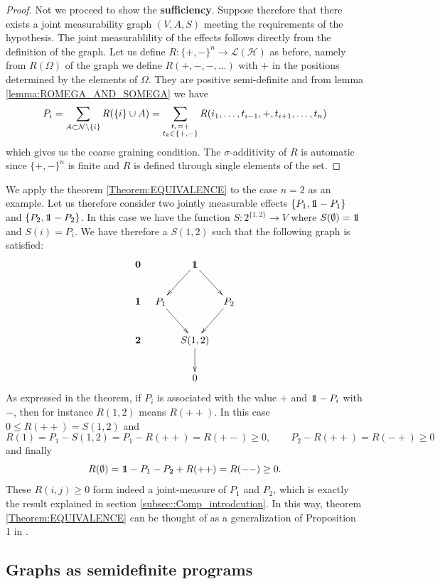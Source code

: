 \documentclass[10pt, a4paper]{amsart}
\begin{document}
\begin{proof}
Not we proceed to show the \textbf{sufficiency}. Suppose therefore that there exists a joint measurability graph $(V,A,S)$ meeting the requirements 
of the hypothesis. The joint measurablility of the effects follows directly from the definition of the graph. Let us define $R:\{+,-\}^{n}\to \mathcal{L}(\mathcal{H})$ as before, namely from $R(\Omega ) $ of the graph we define $R(+,-,-, \ldots )$ with $+$ in the positions determined by the elements of $\Omega$. They are positive semi-definite and from lemma \ref{lemma:ROMEGA_AND_SOMEGA} we have 
$$
P_{i} = \sum_{A\subset \mathcal{N}\backslash \{i\}}R(\{i\}\cup A) = \sum_{\substack{t_{i} = +\\ t_{k}\in \{+,-\}}}  R(i_{1}, \ldots, t_{i-1},+ , t_{i+1}, \ldots, t_{n})
$$
which gives us the coarse graining condition. The $\sigma$-additivity of $R$ is automatic since $\{+,-\}^{n}$ is finite and $R$ is defined through single elements of the set. 


\end{proof}

We apply the theorem \ref{Theorem:EQUIVALENCE} to the case $n=2$ as an example. Let us therefore consider two jointly measurable effects $\{P_{1}, \bbone - P_{1}\}$ and $\{P_{2}, \bbone - P_{2}\}$. In this case we have the function $S: 2^{\{1,2\}}\to V$ where $S(\emptyset ) = \bbone$ and $S(i) = P_{i}$. We have therefore a $S(1,2)$ such that the following graph is satisfied:
$$
\xymatrix@ C = 3mm{
\mathbf{0}&&\bbone\ar[dl]\ar[dr]&\\
\mathbf{1}&P_{1}\ar[dr]&&P_{2}\ar[dl]\\
\mathbf{2}&&S(1,2) \ar[d]&\\
&&0
}
$$
As expressed in the theorem, if $P_{i}$ is associated with the value $+$ and $\bbone - P_{i}$ with $-$, then for instance $R(1,2)$ means $R(++)$. In this case $0\leq R(++) = S(1,2)$ and 
$$
R(1) = P_{1}- S(1,2) = P_{1}- R(++) = R(+-)\geq 0, \qquad P_{2}- R(++)  = R(-+)\geq 0
$$
and finally 
$$
R(\emptyset) = \bbone - P_{1}-P_{2}+ R(++) = R(--)\geq 0.
$$
These $R(i,j)\geq 0$ form indeed a joint-measure of $P_{1}$ and $P_{2}$, which is exactly the result explained in section \ref{subsec::Comp_introdcution}. In this way, theorem \ref{Theorem:EQUIVALENCE} can be thought of as a generalization of Proposition 1 in \cite{wolfgarcia}. 





\newpage
\subsection{Graphs as semidefinite programs}
\label{subsec:Graphs_as_semidefinite_programs}
\end{document}

